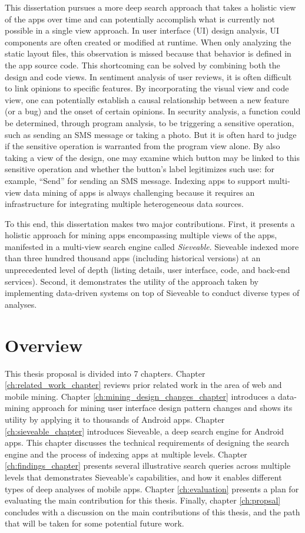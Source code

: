This dissertation pursues a more deep search approach that takes a holistic view of the apps over time and can potentially accomplish what is currently not possible in a single view approach.
In user interface (UI) design analysis, UI components are often created or modified at runtime.
When only analyzing the static layout files, this observation is missed because that behavior is defined in the app source code.
This shortcoming can be solved by combining both the design and code views.
In sentiment analysis of user reviews, it is often difficult to link opinions to specific features.
By incorporating the visual view and code view, one can potentially establish a causal relationship between a new feature (or a bug) and the onset of certain opinions.
In security analysis, a function could be determined, through program analysis, to be triggering a sensitive operation, such as sending an SMS message or taking a photo.
But it is often hard to judge if the sensitive operation is warranted from the program view alone.
By also taking a view of the design, one may examine which button may be linked to this sensitive operation and whether the button's label legitimizes such use: for example, ``Send'' for sending an SMS message.
Indexing apps to support multi-view data mining of apps is always challenging because it requires an infrastructure for integrating multiple heterogeneous data sources.

To this end, this dissertation makes two major contributions.
First, it presents a holistic approach for mining apps encompassing multiple views of the apps, manifested in a multi-view search engine called \textit{Sieveable}.
Sieveable indexed more than three hundred thousand apps (including historical versions) at an unprecedented level of depth (listing details, user interface, code, and back-end services).
Second, it demonstrates the utility of the approach taken by implementing data-driven systems on top of Sieveable to conduct diverse types of analyses.

\section{Overview}
This thesis proposal is divided into 7 chapters.
Chapter \ref{ch:related_work_chapter} reviews prior related work in the area of web and mobile mining.
Chapter \ref{ch:mining_design_changes_chapter} introduces a data-mining approach for mining user interface design pattern changes and shows its utility by applying it to thousands of Android apps.
Chapter \ref{ch:sieveable_chapter} introduces Sieveable, a deep search engine for Android apps. 
This chapter discusses the technical requirements of designing the search engine and the process of indexing apps at multiple levels.
Chapter \ref{ch:findings_chapter} presents several illustrative search queries across multiple levels that demonstrates Sieveable's capabilities, and how it enables different types of deep analyses of mobile apps.
Chapter \ref{ch:evaluation} presents a plan for evaluating the main contribution for this thesis. 
Finally, chapter \ref{ch:propsal} concludes with a discussion on the main contributions of this thesis, and the path that will be taken for some potential future work.